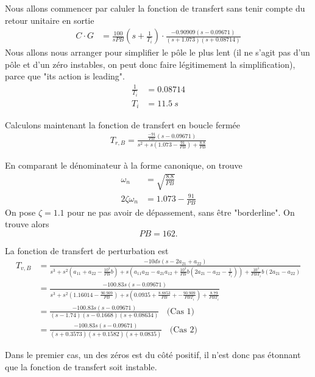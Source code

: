 \documentclass[frenchb, paper=a4, fontsize=11pt]{scrartcl}
\numberwithin{equation}{section}					%
\numberwithin{figure}{section}					%
\numberwithin{table}{section}						%
\begin{document}
Nous allons commencer par caluler la fonction de transfert sans tenir compte du retour unitaire en sortie
\begin{align*}
C\cdot G &= \frac{100}{s PB}(s+\frac{1}{T_i}) \cdot \frac{-0.90909(s-0.09671)}{(s+1.073)(s+0.08714)}
\end{align*} 
Nous allons nous arranger pour simplifier le pôle le plus lent (il ne s'agit pas d'un pôle et d'un zéro instables, on peut donc faire légitimement la simplification), parce que "its action is leading".
\begin{align*}
\frac{1}{T_i} &= 0.08714\\
T_i &= 11.5\ s
\end{align*}


Calculons maintenant la fonction de transfert en boucle fermée
\begin{align*}
T_{r,B} = \frac{\frac{-91}{PB}(s-0.09671)}{s^2 + s (1.073-\frac{91}{PB}) + \frac{8.8}{PB}}
\end{align*}

En comparant le dénominateur à la forme canonique, on trouve
\begin{align*}
\omega_n &= \sqrt{\frac{8.8}{PB}}\\
2\zeta \omega_n &= 1.073-\frac{91}{PB} 
\end{align*}
On pose $\zeta=1.1$ pour ne pas avoir de dépassement, sans être "borderline". On trouve alors 
\begin{equation}
PB=162.
\end{equation}

La fonction de transfert de perturbation est 
\begin{align*}
T_{v,B} &= \frac{-10ds(s-2a_{21}+a_{22})}{s^3+s^2(a_{11}+a_{22}-\frac{10^3}{PB}b)
+s(a_{11}a_{22}-a_{21}a_{12}+\frac{10^3}{PB}b(2a_{21}-a_{22}-\frac{1}{T_i}))
+\frac{10^3}{PBT_i}b(2a_{21}-a_{22})}\\
&=\frac{-100.83 s (s-0.09671)}{s^3 + s^2 (1.16014-\frac{90.909}{PB})+ s(0.0935 + \frac{8.8853}{PB} + - \frac{90.909}{PBT_i}) + \frac{8.79}{PBT_i}} \\
&=  \frac{-100.83 s (s-0.09671)}{(s-1.74)(s-0.1668)(s+0.08634)} \ \ \ \ \text{(Cas 1)}\\
&=  \frac{-100.83 s (s-0.09671)}{(s+0.3573)(s+0.1582)(s+0.0835)} \ \ \ \  \text{(Cas 2)}
\end{align*}

Dans le premier cas, un des zéros est du côté positif, il n'est donc pas étonnant que la fonction de transfert soit instable.
\end{document}
